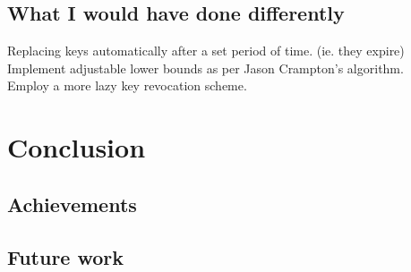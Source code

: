 \documentclass[12pt, titlepage]{article}
\begin{document}
\subsection{What I would have done differently}
Replacing keys automatically after a set period of time. (ie. they expire)
\\ Implement adjustable lower bounds as per Jason Crampton's algorithm.
\\ Employ a more lazy key revocation scheme.

\section{Conclusion}

\subsection{Achievements}

\subsection{Future work}
\end{document}
